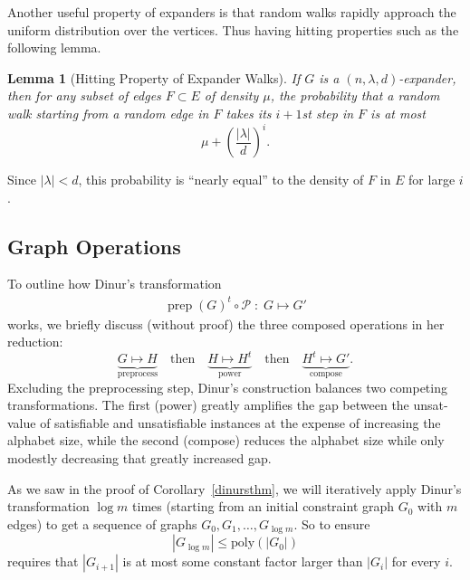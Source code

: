 \documentclass{article}
\newtheorem{lemma}[theorem]{Lemma}
\newcommand{\poly}{{\mathrm{poly}}}
\newcommand{\prep}{{\operatorname{prep}}}
\newcommand{\eqdef}{\mathbin{\stackrel{\rm def}{=}}}
\begin{document}
Another useful property of expanders is that random walks rapidly approach
the uniform distribution over the vertices.
Thus having hitting properties such as the following lemma. 


\begin{lemma}[Hitting Property of Expander Walks]
If $G$ is a $(n, \lambda, d)$-expander, then for any subset of edges $F \subset E$
of density $\mu$, the probability that a random walk starting from a random edge
in $F$ takes its $i+1$st step in $F$ is at most
$$
\mu + \left(\frac{|\lambda|}{d}\right)^i.
$$
\end{lemma}

Since $|\lambda|<d$, this probability is ``nearly equal'' to the density of
$F$ in $E$ for large $i$.

\subsection{Graph Operations}

To outline how Dinur's transformation
\begin{align*}
\prep(G)^t \circ \mathcal{P} \;:\; G \mapsto G'
\end{align*}
works, we briefly discuss (without proof) the three composed operations in her reduction:
$$
\underbrace{G \mapsto H}_\text{preprocess} \quad\text{then}\quad
\underbrace{H \mapsto H^t}_\text{power} \quad\text{then}\quad
\underbrace{H^t \mapsto G'}_\text{compose}.
$$
Excluding the preprocessing step, Dinur's construction balances two
competing transformations.  The first (power) greatly amplifies
the gap between the unsat-value of satisfiable and unsatisfiable
instances at the expense of increasing the alphabet size,
while the second (compose) reduces the alphabet size while only
modestly decreasing that greatly increased gap.

As we saw in the proof of Corollary~\ref{dinursthm}, we will iteratively apply
Dinur's transformation $\log m$ times (starting from an initial constraint graph
$G_0$ with $m$ edges) to get a sequence of graphs $G_0, G_1, \dots, G_{\log m}$.
So to ensure
$$
|G_{\log m}| \le \poly(|G_0|)
$$
requires that $|G_{i+1}|$ is at most some constant factor larger
than $|G_i|$ for every $i$.
\end{document}
